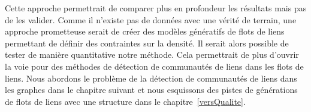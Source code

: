 Cette approche permettrait de comparer plus en profondeur les résultats mais pas de les valider.
Comme il n'existe pas de données avec une vérité de terrain, une approche prometteuse serait de créer des modèles génératifs de flots de liens permettant de définir des contraintes sur la densité.
Il serait alors possible de tester de manière quantitative notre méthode.
Cela permettrait de plus d'ouvrir la voie pour des méthodes de détection de communautés de liens dans les flots de liens.
Nous abordons le problème de la détection de communautés de liens dans les graphes dans le chapitre suivant et nous esquissons des pistes de générations de flots de liens avec une structure dans le chapitre~\ref{versQualite}.